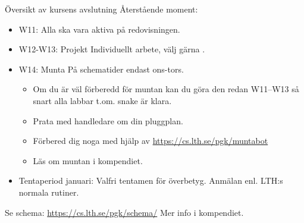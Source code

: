 
\begin{Slide}{Översikt av kursens avslutning}
Återstående moment:
\begin{itemize}
\item W11:  \hfill Alla ska vara aktiva på redovisningen.
\item W12-W13: Projekt \hfill Individuellt arbete, välj gärna .
\item W14: Munta \hfill På schematider endast ons-tors.
\begin{itemize}
\item Om du är väl förberedd för muntan kan du göra den redan W11--W13 så snart alla labbar t.om. snake är klara. 
\item Prata med handledare om din pluggplan.
\item Förbered dig noga med hjälp av \url{https://cs.lth.se/pgk/muntabot}
\item Läs om muntan i kompendiet.
\end{itemize}
\item Tentaperiod januari: Valfri tentamen för överbetyg. Anmälan enl. LTH:s normala rutiner. 
\end{itemize}
Se schema: \url{https://cs.lth.se/pgk/schema/}
\ifkompendium\else
\newline
Mer info i kompendiet.
\fi
\end{Slide}




